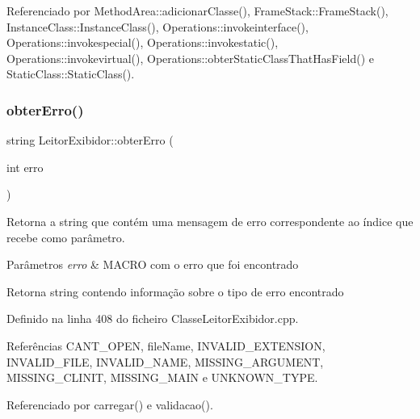 Referenciado por Method\+Area\+::adicionar\+Classe(), Frame\+Stack\+::\+Frame\+Stack(), Instance\+Class\+::\+Instance\+Class(), Operations\+::invokeinterface(), Operations\+::invokespecial(), Operations\+::invokestatic(), Operations\+::invokevirtual(), Operations\+::obter\+Static\+Class\+That\+Has\+Field() e Static\+Class\+::\+Static\+Class().

\mbox{\label{classLeitorExibidor_abf046987d5b3f0ec33794a547a8f9e25}} 
\subsubsection{\texorpdfstring{obter\+Erro()}{obterErro()}}
{\footnotesize\ttfamily string Leitor\+Exibidor\+::obter\+Erro (\begin{DoxyParamCaption}\item[{int}]{erro }\end{DoxyParamCaption})\hspace{0.3cm}{\ttfamily [private]}}



Retorna a string que contém uma mensagem de erro correspondente ao índice que recebe como parâmetro. 


\begin{DoxyParams}{Parâmetros}
{\em erro} & M\+A\+C\+RO com o erro que foi encontrado \\
\hline
\end{DoxyParams}
\begin{DoxyReturn}{Retorna}
string contendo informação sobre o tipo de erro encontrado 
\end{DoxyReturn}


Definido na linha 408 do ficheiro Classe\+Leitor\+Exibidor.\+cpp.



Referências C\+A\+N\+T\+\_\+\+O\+P\+EN, file\+Name, I\+N\+V\+A\+L\+I\+D\+\_\+\+E\+X\+T\+E\+N\+S\+I\+ON, I\+N\+V\+A\+L\+I\+D\+\_\+\+F\+I\+LE, I\+N\+V\+A\+L\+I\+D\+\_\+\+N\+A\+ME, M\+I\+S\+S\+I\+N\+G\+\_\+\+A\+R\+G\+U\+M\+E\+NT, M\+I\+S\+S\+I\+N\+G\+\_\+\+C\+L\+I\+N\+IT, M\+I\+S\+S\+I\+N\+G\+\_\+\+M\+A\+IN e U\+N\+K\+N\+O\+W\+N\+\_\+\+T\+Y\+PE.



Referenciado por carregar() e validacao().

\mbox{\label{classLeitorExibidor_af51949669ace432f66221710ef3a3b00}} 
